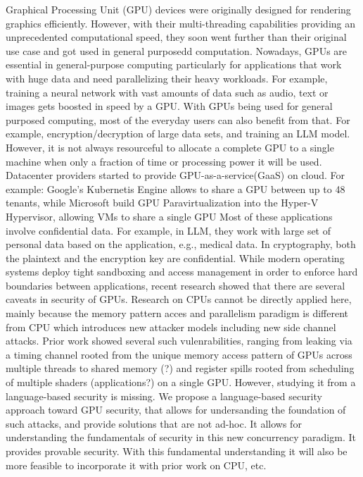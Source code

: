  Graphical Processing Unit (GPU) devices were originally designed for rendering graphics efficiently.
%
However, with their multi-threading capabilities providing an unprecedented computational speed, they soon went further than their original use case and got used in general purposedd computation. 
%
Nowadays, GPUs are essential in general-purpose computing particularly for applications that work with huge data and need parallelizing their heavy workloads.
%
For example, training a neural network with vast amounts of data such as audio, text or images gets boosted in speed by a GPU.
%
With GPUs being used for general purposed computing, most of the everyday users can also benefit from that.
%
For example, encryption/decryption of large data sets, and training an LLM model.
%
However, it is not always resourceful to allocate a complete GPU to a single machine when only a fraction of time or processing power it will be used.
%
Datacenter providers started to provide GPU-as-a-service(GaaS) on cloud.
%
For example: Google's Kubernetis Engine allows to share
a GPU between up to 48 tenants, while Microsoft build
GPU Paravirtualization into the Hyper-V Hypervisor, allowing VMs to share a single GPU
Most of these applications involve confidential data. 
%
For example, in LLM, they work with large set of personal data based on the application, e.g., medical data.
%
In cryptography, both the plaintext and the encryption key are confidential.
%
While modern operating systems deploy
tight sandboxing and access management in order to
enforce hard boundaries between applications, recent research showed that there are several caveats in security of GPUs.
%
Research on CPUs cannot be directly applied here, mainly because the memory pattern acces and parallelism paradigm is different from CPU which introduces new attacker models including new side channel attacks.
%
%
%
%
Prior work showed several such vulenrabilities, ranging from leaking via a timing channel rooted from the unique memory access pattern of GPUs across multiple threads to shared memory (?) and register spills rooted from scheduling of multiple shaders (applications?) on a single GPU.
%
However, studying it from a language-based security is missing.
%
We propose a language-based security approach toward GPU security, that allows for undersanding the foundation of such attacks, and provide solutions that are not ad-hoc.
%
It allows for understanding the fundamentals of security in this new concurrency paradigm.
%
It provides provable security.
%
With this fundamental understanding it will also be more feasible to incorporate it with prior work on CPU, etc.
%



